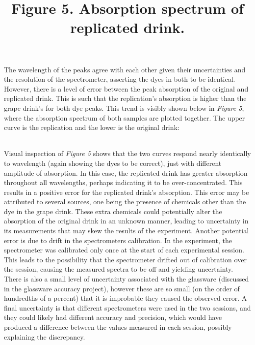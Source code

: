 \documentclass[12pt]{article}
\begin{document}
The wavelength of the peaks agree with each other given their uncertainties and the resolution of the spectrometer, asserting the dyes in both to be identical. However, there is a level of error between the peak absorption of the original and replicated drink. This is such that the replication's absorption is higher than the grape drink's for both dye peaks. This trend is visibly shown below in \textit{Figure 5}, where the absorption spectrum of both samples are plotted together. The upper curve is the replication and the lower is the original drink:\\
\title{\textbf{Figure 5.} Absorption spectrum of replicated drink.}
\begin {figure}[htb!]
  \begin{center}
    	\resizebox{0.6\textwidth}{!}{}
  \end	{center}
\end {figure}\\
Visual inspection of \textit{Figure 5} shows that the two curves respond nearly identically to wavelength (again showing the dyes to be correct), just with different amplitude of absorption. In this case, the replicated drink has greater absorption throughout all wavelengths, perhaps indicating it to be over-concentrated. This results in a positive error for the replicated drink's absorption. This error may be attributed to several sources, one being the presence of chemicals other than the dye in the grape drink. These extra chemicals could potentially alter the absorption of the original drink in an unknown manner, leading to uncertainty in its measurements that may skew the results of the experiment. Another potential error is due to drift in the spectrometers calibration. In the experiment, the spectrometer was calibrated only once at the start of each experimental session. This leads to the possibility that the spectrometer drifted out of calibration over the session, causing the measured spectra to be off and yielding uncertainty. There is also a small level of uncertainty associated with the glassware (discussed in the glassware accuracy project), however these are so small (on the order of hundredths of a percent) that it is improbable they caused the observed error. A final uncertainty is that different spectrometers were used in the two sessions, and they could likely had different accuracy and precision, which would have produced a difference between the values measured in each session, possibly explaining the discrepancy. 
\vspace{12pt}\\
\end{document}
